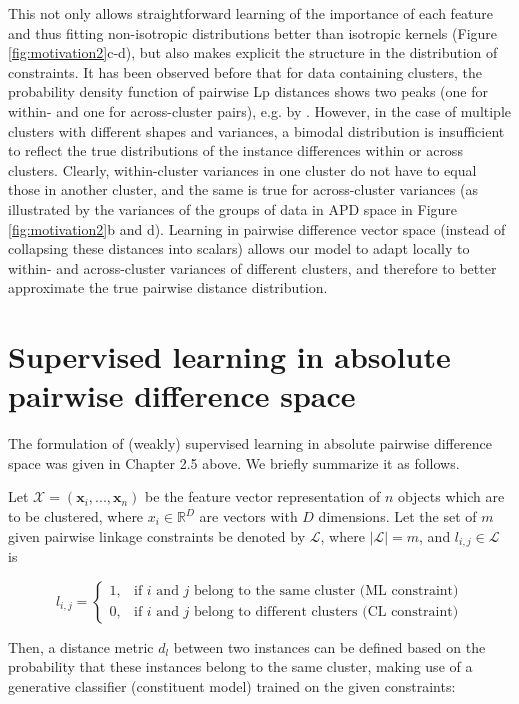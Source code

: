 This not only allows straightforward learning of the importance of each feature and thus fitting non-isotropic distributions better than isotropic kernels (Figure \ref{fig:motivation2}c-d), but also makes explicit the structure in the distribution of constraints. It has been observed before that for data containing clusters, the probability density function of pairwise Lp distances shows two peaks (one for within- and one for across-cluster pairs), e.g. by \citep{brin1995near}. However, in the case of multiple clusters with different shapes and variances, a bimodal distribution is insufficient to reflect the true distributions of the instance differences within or across clusters. Clearly, within-cluster variances in one cluster do not have to equal those in another cluster, and the same is true for across-cluster variances (as illustrated by the variances of the groups of data in APD space in Figure \ref{fig:motivation2}b and d). Learning in pairwise difference vector space (instead of collapsing these distances into scalars) allows our model to adapt locally to within- and across-cluster variances of different clusters, and therefore to better approximate the true pairwise distance distribution. 

\section{Supervised learning in absolute pairwise difference space}

The formulation of (weakly) supervised learning in absolute pairwise difference space was given in Chapter 2.5 above. We briefly summarize it as follows.

Let $\mathcal{X}=(\boldsymbol x_i, ..., \boldsymbol x_n)$ be the feature vector representation of $n$ objects which are to be clustered, where $x_i \in \mathbb{R}^D$ are vectors with $D$ dimensions. Let the set of $m$ given pairwise linkage constraints be denoted by $\mathcal{L}$, where $ \lvert \mathcal{L} \lvert = m $, and $l_{i,j} \in \mathcal{L}$ is

\begin{equation}
l_{i,j}=
\begin{cases}
1, & \text{if $i$ and $j$ belong to the same cluster (ML constraint)} \\
0, & \text{if $i$ and $j$ belong to different clusters (CL constraint)}
\end{cases}
\end{equation}

Then, a distance metric $d_l$ between two instances can be defined based on the probability that these instances belong to the same cluster, making use of a generative classifier (constituent model) trained on the given constraints:

